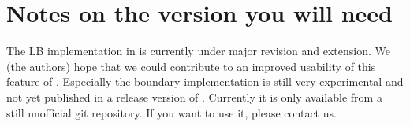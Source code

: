 \section*{Notes on the \ES{} version you will need}
The LB implementation in \ES{} is currently under major revision
and extension. We (the authors) hope that we could contribute
to an improved usability of this feature of \ES{}. Especially 
the boundary implementation is still very experimental and
not yet published in a release version of \ES{}. Currently 
it is only available from a still unofficial git repository. 
If you want to use it, please contact us.
